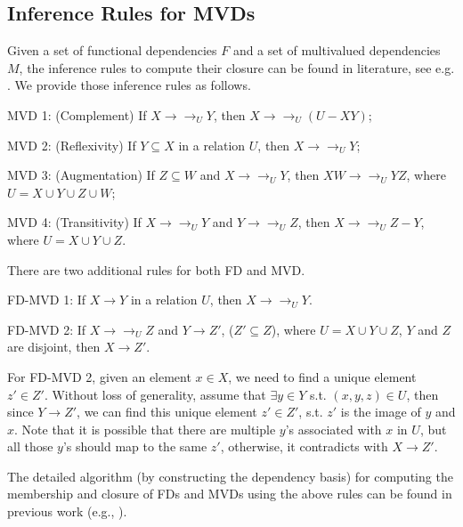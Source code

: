
\subsection{Inference Rules for MVDs} \label{sec:MVDInference}

Given a set of functional dependencies $F$ and a set of multivalued dependencies $M$, the inference rules to compute their closure can be found in literature, see e.g. \cite{10.5555/551350,10.1145/320613.320614,10.1145/509404.509414}. We provide those inference rules as follows. 
  
MVD 1: (Complement) If $X \to\to_U Y$, then $X \to\to_U (U-XY)$;

MVD 2: (Reflexivity) If $Y \subseteq X$ in a relation $U$, then $X \to\to_U Y$;

MVD 3: (Augmentation) If $Z \subseteq W$ and $X \to\to_U Y$, then $XW \to\to_U YZ$, where $U = X \cup Y \cup Z \cup W$;

MVD 4: (Transitivity) If $X \to\to_U Y$ and $Y \to\to_U Z$, then $X \to\to_U Z-Y$, where $U = X \cup Y \cup Z$.


There are two additional rules for both FD and MVD.

FD-MVD 1: If $X \to Y$ in a relation $U$, then $X \to\to_U Y$.

FD-MVD 2: If $X \to\to_U Z$ and $Y \to Z'$, ($Z' \subseteq Z$), where $U=X\cup Y \cup Z$, $Y$ and $Z$ are disjoint, then $X \to Z'$. 

For FD-MVD 2, given an element $x \in X$, we need to find a unique element $z' \in Z'$.  Without loss of generality, assume that $\exists y \in Y$ s.t.  $(x,y,z)\in U $, then since $Y \to Z'$, we can find this unique element $z' \in Z'$, s.t. $z'$ is the image of $y$ and $x$. Note that it is possible that there are multiple $y$'s associated with $x$ in $U$, but all those $y$'s should map to the same $z'$, otherwise, it contradicts with $X \to Z'$.

The detailed algorithm (by constructing the dependency basis) for computing the membership and closure of FDs and MVDs using the above rules can be found in previous work (e.g., \cite{10.1145/320613.320614,10.1145/322186.322190}).
 
